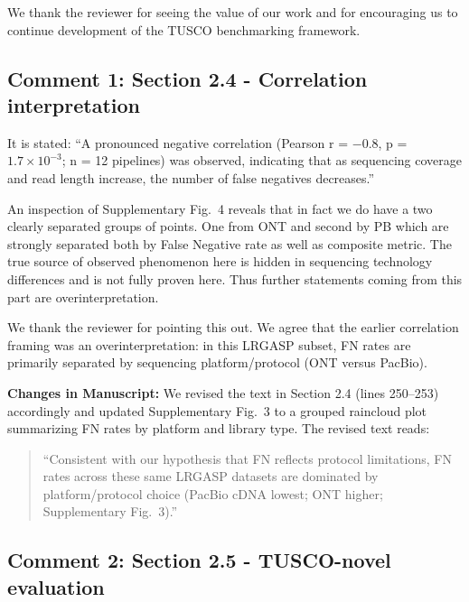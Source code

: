 \documentclass[11pt]{article}
\begin{document}
\begin{responseboxnew}
We thank the reviewer for seeing the value of our work and for encouraging us to continue development of the TUSCO benchmarking framework.
\end{responseboxnew}

\subsection{Comment 1: Section 2.4 - Correlation interpretation}

\begin{reviewercomment}
It is stated: ``A pronounced negative correlation (Pearson r = $-0.8$, p = $1.7 \times 10^{-3}$; n = 12 pipelines) was observed, indicating that as sequencing coverage and read length increase, the number of false negatives decreases.''

\vspace{0.2cm}
An inspection of Supplementary Fig.~4 reveals that in fact we do have a two clearly separated groups of points. One from ONT and second by PB which are strongly separated both by False Negative rate as well as composite metric. The true source of observed phenomenon here is hidden in sequencing technology differences and is not fully proven here. Thus further statements coming from this part are overinterpretation.
\end{reviewercomment}

\begin{responseboxnew}
We thank the reviewer for pointing this out. We agree that the earlier correlation framing was an overinterpretation: in this LRGASP subset, FN rates are primarily separated by sequencing platform/protocol (ONT versus PacBio).

\vspace{0.3cm}
\textbf{Changes in Manuscript:} We revised the text in Section 2.4 (lines 250--253) accordingly and updated Supplementary Fig.~3 to a grouped raincloud plot summarizing FN rates by platform and library type. The revised text reads:
\begin{quote}
``Consistent with our hypothesis that FN reflects protocol limitations, FN rates across these same LRGASP datasets are dominated by platform/protocol choice (PacBio cDNA lowest; ONT higher; Supplementary Fig.~3).''
\end{quote}
\end{responseboxnew}

\subsection{Comment 2: Section 2.5 - TUSCO-novel evaluation}
\end{document}
